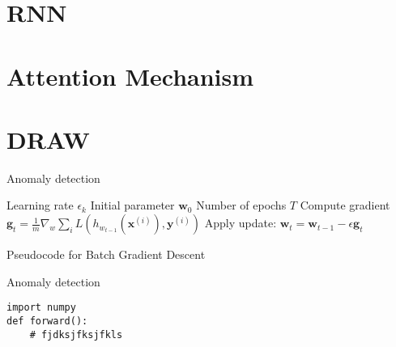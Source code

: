 \documentclass{beamer}
\begin{document}
\section{RNN}

\section{Attention Mechanism}

\section{DRAW}

\begin{frame}{Anomaly detection}  
\begin{algorithm}[H]
	\begin{algorithmic}
		\REQUIRE Learning rate $\epsilon_k$
		\REQUIRE Initial parameter $\bm{w}_0$
		\REQUIRE Number of epochs $T$
		\STATE Compute gradient $\bm{g}_t=\frac{1}{m}\nabla_w\sum_i L(h_{w_{t-1}}(\bm{x}^{(i)}), \bm{y}^{(i)})$ 
		\STATE Apply update: $\bm{w}_t=\bm{w}_{t-1}-\epsilon \bm{g}_t$
		\ENDFOR
	\end{algorithmic}
	\caption{Pseudocode for Batch Gradient Descent}
	\label{alg:seq}
\end{algorithm}
\end{frame}

\begin{frame}[fragile]{Anomaly detection}
\begin{verbatim}
import numpy
def forward():
    # fjdksjfksjfkls
\end{verbatim}
\end{frame}
\end{document}
